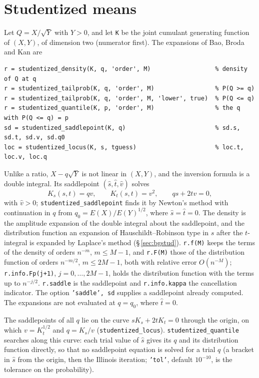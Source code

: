 \documentclass[11pt]{article}
\newcommand{\prog}[1]{\texttt{#1}}
\begin{document}
\section{Studentized means}\label{sec:stud}

Let $Q=X/\sqrt{Y}$ with $Y>0$, and let \prog{K} be the joint cumulant generating function of $(X,Y)$,
of dimension two (numerator first). The expansions of Bao, Broda and Kan are
\begin{lstlisting}
r = studentized_density(K, q, 'order', M)                  % density of Q at q
r = studentized_tailprob(K, q, 'order', M)                 % P(Q >= q)
r = studentized_tailprob(K, q, 'order', M, 'lower', true)  % P(Q <= q)
r = studentized_quantile(K, p, 'order', M)                 % the q with P(Q <= q) = p
sd = studentized_saddlepoint(K, q)                         % sd.s, sd.t, sd.v, sd.q0
loc = studentized_locus(K, s, tguess)                      % loc.t, loc.v, loc.q
\end{lstlisting}
Unlike a ratio, $X-q\sqrt Y$ is not linear in $(X,Y)$, and the inversion formula is a double
integral. Its saddlepoint $(\hat s,\hat t,\hat v)$ solves
\[
K_s(s,t)=qv,\qquad K_t(s,t)=v^2,\qquad qs+2tv=0,
\]
with $\hat v>0$; \prog{studentized\_saddlepoint} finds it by Newton's method with continuation in $q$
from $q_0=E(X)/E(Y)^{1/2}$, where $\hat s=\hat t=0$. The density is the amplitude expansion of the
double integral about the saddlepoint, and the distribution function an expansion of
Hauschildt--Robinson type in $s$ after the $t$-integral is expanded by Laplace's method
(\S\,\ref{sec:bgstud}). \prog{r.f(M)} keeps the terms of the density of orders $n^{-m}$, $m\leq M-1$,
and \prog{r.F(M)} those of the distribution function of orders $n^{-m/2}$, $m\leq 2M-1$, both with
relative error $O(n^{-M})$; \prog{r.info.Fp(j+1)}, $j=0,\ldots,2M-1$, holds the distribution function
with the terms up to $n^{-j/2}$. \prog{r.saddle} is the saddlepoint and \prog{r.info.kappa} the
cancellation indicator. The option \prog{'saddle', sd} supplies a saddlepoint already computed. The
expansions are not evaluated at $q=q_0$, where $\hat t=0$.

The saddlepoints of all $q$ lie on the curve $sK_s+2tK_t=0$ through the origin, on which
$v=K_t^{1/2}$ and $q=K_s/v$ (\prog{studentized\_locus}). \prog{studentized\_quantile} searches along
this curve: each trial value of $\hat s$ gives its $q$ and its distribution function directly, so that
no saddlepoint equation is solved for a trial $q$ (a bracket in $\hat s$ from the origin, then the
Illinois iteration; \prog{'tol'}, default $10^{-10}$, is the tolerance on the probability).
\end{document}
